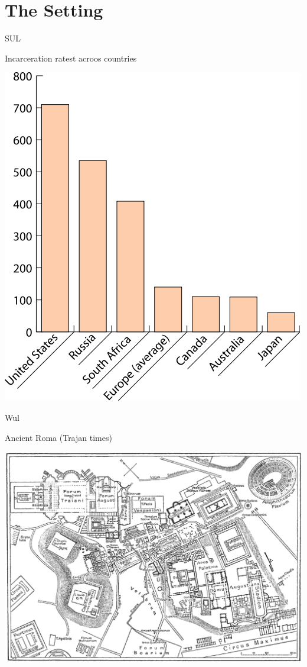 \documentclass[print,Draft]{faosyb}
\begin{document}

\selectcolor
\selecticon

\mainmatter
\part{The Setting}
\lipsum
\twocolumn

\begin{chart}{S}{UL}
\caption{Incarceration ratest acroos countries}
\label{chart:incarceration}
\includegraphics[width=\chartwidth,height=\chartheight]{incarceration}  
\end{chart}

\begin{map}{W}{ul}
\caption{Ancient Roma \newline (Trajan times)}
\label{map:roma}
\includegraphics[width=\chartwidth,height=\chartheight]{Rome}
\end{map}
\end{document}
